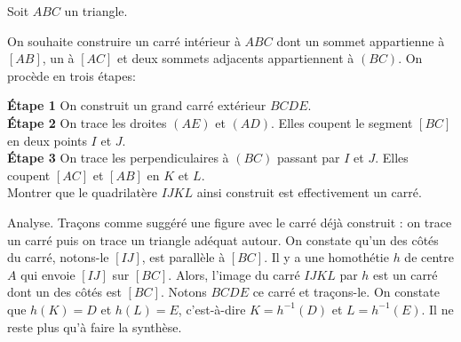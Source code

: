 \begin{exo}
Soit $ABC$ un triangle.

On souhaite construire un carré intérieur à $ABC$ dont un sommet appartienne à $[AB]$, un à $[AC]$ et deux sommets adjacents appartiennent à $(BC)$. On procède en trois étapes:

\noindent\textbf{Étape 1} On construit un grand carré extérieur $BCDE$.\\
\textbf{Étape 2}  On  trace les droites $(AE)$ et $(AD)$. Elles  coupent le segment $[BC]$ en deux points $I$ et $J$.\\
\textbf{Étape 3}  On trace les perpendiculaires à $(BC)$ passant par $I$ et $J$. Elles coupent $[AC]$ et $[AB]$ en $K$ et $L$.\\

Montrer que le quadrilatère $IJKL$ ainsi construit est effectivement un carré.
\begin{center}
\end{center}
\begin{hint}   

\end{hint}      
\begin{sol} 

Analyse. Traçons comme suggéré une figure avec le carré déjà construit : on trace un carré puis on trace un triangle adéquat autour. On constate qu'un des côtés du carré, notons-le $[IJ]$, est parallèle à $[BC]$. Il y a une homothétie $h$ de centre $A$ qui envoie $[IJ]$ sur $[BC]$. Alors, l'image du carré $IJKL$ par $h$ est un carré dont un des côtés est $[BC]$. Notons $BCDE$ ce carré et traçons-le. On constate que $h(K)=D$ et $h(L)=E$, c'est-à-dire $K=h^{-1}(D)$ et $L = h^{-1}(E)$. Il ne reste plus qu'à faire la synthèse.


\end{sol}  
\end{exo}  




